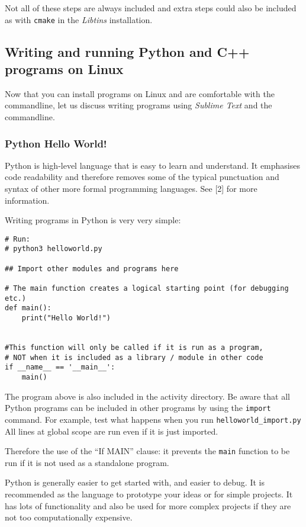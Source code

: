 \documentclass[a4paper]{article}
\begin{document}
Not all of these steps are always included and extra steps could also be included as with \texttt{cmake} in the \emph{Libtins} installation. 

\subsection{Writing and running Python and C++ programs on Linux}
Now that you can install programs on Linux and are comfortable with the commandline, let us discuss writing programs using \emph{Sublime Text} and the commandline. 

\subsubsection{Python Hello World!}
Python is high-level language that is easy to learn and understand. It emphasises code readability and therefore removes some of the typical punctuation and syntax of other more formal programming languages. See [2] for more information.

Writing programs in Python is very very simple:

\begin{lstlisting}
# Run: 
# python3 helloworld.py

## Import other modules and programs here

# The main function creates a logical starting point (for debugging etc.)
def main():
    print("Hello World!")


#This function will only be called if it is run as a program, 
# NOT when it is included as a library / module in other code
if __name__ == '__main__':
    main()
\end{lstlisting}

The program above is also included in the activity directory. Be aware that all Python programs can be included in other programs by using the \texttt{import} command. For example, test what happens when you run \texttt{helloworld\_import.py}
All lines at global scope are run even if it is just imported. 

Therefore the use of the ``If MAIN'' clause: it prevents the \texttt{main} function to be run if it is not used as a standalone program.

Python is generally easier to get started with, and easier to debug. It is recommended as the language to prototype your ideas or for simple projects. It has lots of functionality and also be used for more complex projects if they are not too computationally expensive. 
\end{document}
